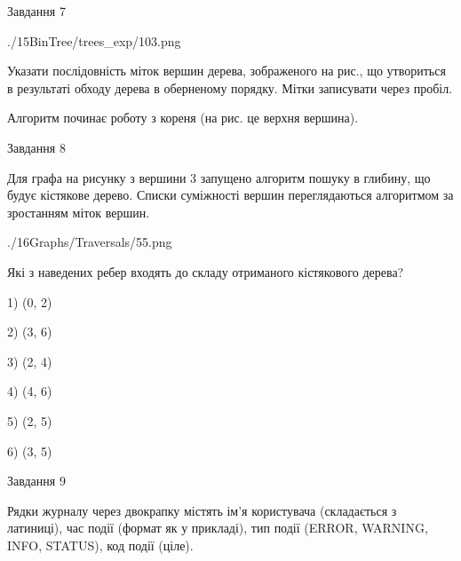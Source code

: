 \documentclass[12pt, ukrainian]{article}
\begin{document}
{\vspace{10mm}\par

\newpage
\begin{minipage}[t]{9.7cm}
               
{\begin{center}Завдання {7}\end{center}}
\vspace{-6mm}

\begin{center}
	{./15BinTree/trees_exp/103.png}
\end{center}
Указати послідовність міток вершин дерева, зображеного на рис., що утвориться в результаті обходу дерева в оберненому порядку. Мітки записувати через пробіл.\par Алгоритм починає роботу з кореня (на рис. це верхня вершина).\par

\end{minipage}
\vline \hspace{8mm}
\begin{minipage}[t]{8.0cm}
               
{\begin{center}Завдання {8}\end{center}}
\vspace{-6mm}
Для графа на рисунку з вершини 3 запущено алгоритм пошуку в глибину, що будує кістякове дерево. Списки суміжності вершин переглядаються алгоритмом за зростанням міток вершин.\par
\begin{center}
	{./16Graphs/Traversals/55.png}
\end{center}
\par Які з наведених ребер входять до складу отриманого кістякового дерева?\par
1) (0, 2)\par
2) (3, 6)\par
3) (2, 4)\par
4) (4, 6)\par
5) (2, 5)\par
6) (3, 5)\par
{\vskip 15pt} \par

\end{minipage}

               
{\begin{center}Завдання {9}\end{center}}
\vspace{-6mm}
Рядки журналу через двокрапку містять ім'я користувача (складається з латиниці), час події (фор\-мат як у прикладі), тип події (ERROR, WARNING, INFO, STATUS), код події (ціле).

}
\end{document}
